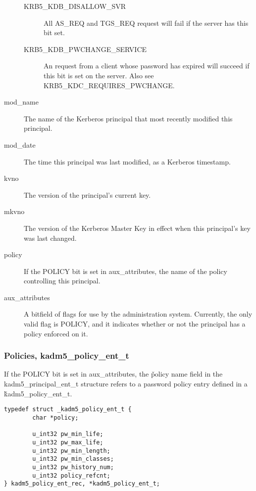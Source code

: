 \begin{description}
\begin{description}
\item[KRB5_KDB_DISALLOW_SVR] All AS_REQ and TGS_REQ request will fail
if the server has this bit set.

\item[KRB5_KDB_PWCHANGE_SERVICE] An request from a client whose
password has expired will succeed if this bit is set on the server.
Also see KRB5_KDC_REQUIRES_PWCHANGE.
\end{description}

\item[mod_name] The name of the Kerberos principal that most recently
modified this principal.

\item[mod_date] The time this principal was last modified, as a Kerberos
timestamp.

\item[kvno] The version of the principal's current key.

\item[mkvno] The version of the Kerberos Master Key in effect when
this principal's key was last changed.

\item[policy] If the POLICY bit is set in aux_attributes, the name
of the policy controlling this principal.

\item[aux_attributes]  A bitfield of flags for use by the
administration system.  Currently, the only valid flag is POLICY, and
it indicates whether or not the principal has a policy enforced on it.
\end{description}

\subsubsection{Policies, kadm5_policy_ent_t}
\label{sec:policy-fields}

If the POLICY bit is set in aux_attributes, the \v{policy} name field
in the kadm5_principal_ent_t structure refers to a password
policy entry defined in a \v{kadm5_policy_ent_t}.

\begin{verbatim}
typedef struct _kadm5_policy_ent_t {
        char *policy;

        u_int32 pw_min_life;
        u_int32 pw_max_life;
        u_int32 pw_min_length;
        u_int32 pw_min_classes;
        u_int32 pw_history_num;
        u_int32 policy_refcnt;
} kadm5_policy_ent_rec, *kadm5_policy_ent_t;
\end{verbatim}

